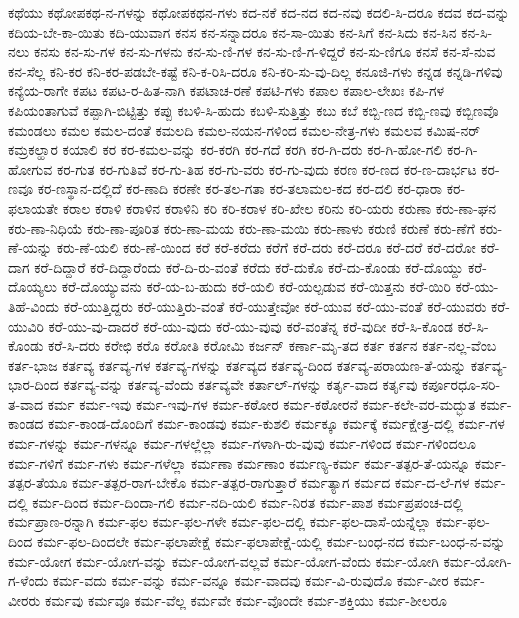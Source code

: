 {ಕಥೆಯು
ಕಥೋಪಕಥ-ನ-ಗಳನ್ನು
ಕಥೋಪಕಥನ-ಗಳು
ಕದ-ನಕೆ
ಕದ-ನದ
ಕದ-ನವು
ಕದಲಿ-ಸಿ-ದರೂ
ಕದವ
ಕದ-ವನ್ನು
ಕದಿಯ-ಬೇ-ಕಾ-ಯಿತು
ಕದಿ-ಯುವಾಗ
ಕನಸ
ಕನ-ಸನ್ನಾದರೂ
ಕನ-ಸಾ-ಯಿತು
ಕನ-ಸಿಗೆ
ಕನ-ಸಿದು
ಕನ-ಸಿನ
ಕನ-ಸಿ-ನಲು
ಕನಸು
ಕನ-ಸು-ಗಳ
ಕನ-ಸು-ಗಳನು
ಕನ-ಸು-ಣಿ-ಗಳ
ಕನ-ಸು-ಣಿ-ಗ-ಳಿದ್ದರೆ
ಕನ-ಸು-ಣಿಗೂ
ಕನಸೆ
ಕನ-ಸೆ-ನುವ
ಕನ-ಸೆಲ್ಲ
ಕನಿ-ಕರ
ಕನಿ-ಕರ-ಪಡಬೇ-ಕಷ್ಟೆ
ಕನಿ-ಕ-ರಿಸಿ-ದರೂ
ಕನಿ-ಕರಿ-ಸು-ವು-ದಿಲ್ಲ
ಕನೂಜಿ-ಗಳು
ಕನ್ನಡ
ಕನ್ನಡಿ-ಗಳಿವು
ಕನ್ಯೆಯ-ರಾಗೇ
ಕಪಟ
ಕಪಟ-ರ-ಹಿತ-ನಾಗಿ
ಕಪಟಾಚ-ರಣೆ
ಕಪಟಿ-ಗಳು
ಕಪಾಲ
ಕಪಾಲ-ಲೇಖಃ
ಕಪಿ-ಗಳ
ಕಪಿಯಂತಾಗುವೆ
ಕಪ್ಪಾಗಿ-ಬಿಟ್ಟಿತ್ತು
ಕಪ್ಪು
ಕಬಳಿ-ಸಿ-ಹುದು
ಕಬಳಿ-ಸುತ್ತಿತ್ತು
ಕಬು
ಕಬೆ
ಕಬ್ಬಿ-ಣದ
ಕಬ್ಬಿ-ಣವು
ಕಬ್ಬಿಣವೊ
ಕಮಂಡಲು
ಕಮಲ
ಕಮಲ-ದಂತೆ
ಕಮಲದಿ
ಕಮಲ-ನಯನ-ಗಳಿಂದ
ಕಮಲ-ನೇತ್ರ-ಗಳು
ಕಮಲವ
ಕಮಿಷ-ನರ್
ಕಮ್ರಕಲ್ಹಾರ
ಕಯಾಲಿ
ಕರ
ಕರ-ಕಮಲ-ವನ್ನು
ಕರ-ಕರಗಿ
ಕರ-ಗದೆ
ಕರಗಿ
ಕರ-ಗಿ-ದರು
ಕರ-ಗಿ-ಹೋ-ಗಲಿ
ಕರ-ಗಿ-ಹೋಗುವ
ಕರ-ಗುತ
ಕರ-ಗುತಿವೆ
ಕರ-ಗು-ತಿಹ
ಕರ-ಗು-ವರು
ಕರ-ಗು-ವುದು
ಕರಣ
ಕರ-ಣದ
ಕರ-ಣ-ದಾರ್ಭಟ
ಕರ-ಣವೂ
ಕರ-ಣಸ್ಥಾನ-ದಲ್ಲಿದೆ
ಕರ-ಣಾದಿ
ಕರಣೇ
ಕರ-ತಲ-ಗತಾ
ಕರ-ತಲಾಮಲ-ಕದ
ಕರ-ದಲಿ
ಕರ-ಧಾರಾ
ಕರ-ಫಲಾಯತೇ
ಕರಾಲ
ಕರಾಳಿ
ಕರಾಳಿನ
ಕರಾಳಿನಿ
ಕರಿ
ಕರಿ-ಕರಾಳ
ಕರಿ-ಖೇಲ
ಕರಿನು
ಕರಿ-ಯರು
ಕರುಣಾ
ಕರು-ಣಾ-ಘನ
ಕರು-ಣಾ-ನಿಧಿಯೆ
ಕರು-ಣಾ-ಪೂರಿತ
ಕರು-ಣಾ-ಮಯ
ಕರು-ಣಾ-ಮಯಿ
ಕರು-ಣಾಳು
ಕರುಣಿ
ಕರುಣೆ
ಕರು-ಣೆಗೆ
ಕರು-ಣೆ-ಯನ್ನು
ಕರು-ಣೆ-ಯಲಿ
ಕರು-ಣೆ-ಯಿಂದ
ಕರೆ
ಕರೆ-ಕರೆದು
ಕರೆಗೆ
ಕರೆ-ದರು
ಕರೆ-ದರೂ
ಕರೆ-ದರೆ
ಕರೆ-ದರೋ
ಕರೆ-ದಾಗ
ಕರೆ-ದಿದ್ದಾರೆ
ಕರೆ-ದಿದ್ದಾರೆಂದು
ಕರೆ-ದಿ-ರು-ವಂತೆ
ಕರೆದು
ಕರೆ-ದುಕೊ
ಕರೆ-ದು-ಕೊಂಡು
ಕರೆ-ದೊಯ್ದು
ಕರೆ-ದೊಯ್ಯಲು
ಕರೆ-ದೊಯ್ಯುವನು
ಕರೆ-ಯ-ಬ-ಹುದು
ಕರೆ-ಯಲಿ
ಕರೆ-ಯಲ್ಪಡುವ
ಕರೆ-ಯಿತ್ತನು
ಕರೆ-ಯಿರಿ
ಕರೆ-ಯು-ತಿಹೆ-ವಿಂದು
ಕರೆ-ಯುತ್ತಿದ್ದರು
ಕರೆ-ಯುತ್ತಿರು-ವಂತೆ
ಕರೆ-ಯುತ್ತೇವೋ
ಕರೆ-ಯುವ
ಕರೆ-ಯು-ವಂತೆ
ಕರೆ-ಯುವರು
ಕರೆ-ಯುವಿರಿ
ಕರೆ-ಯು-ವು-ದಾದರೆ
ಕರೆ-ಯು-ವುದು
ಕರೆ-ಯು-ವುವು
ಕರೆ-ವಂತೆನ್ನ
ಕರೆ-ವುದೀ
ಕರೆ-ಸಿ-ಕೊಂಡ
ಕರೆ-ಸಿ-ಕೊಂಡು
ಕರೆ-ಸಿ-ದರು
ಕರೇಛಿ
ಕರೊ
ಕರೋತಿ
ಕರೋಮಿ
ಕರ್ಜನ್
ಕರ್ಣಾ-ಮೃ-ತದ
ಕರ್ತ
ಕರ್ತನ
ಕರ್ತ-ನಲ್ಲ-ವೆಂಬ
ಕರ್ತ-ಭಾಜ
ಕರ್ತವ್ಯ
ಕರ್ತವ್ಯ-ಗಳ
ಕರ್ತವ್ಯ-ಗಳನ್ನು
ಕರ್ತವ್ಯದ
ಕರ್ತವ್ಯ-ದಿಂದ
ಕರ್ತವ್ಯ-ಪರಾಯಣ-ತೆ-ಯನ್ನು
ಕರ್ತವ್ಯ-ಭಾರ-ದಿಂದ
ಕರ್ತವ್ಯ-ವನ್ನು
ಕರ್ತವ್ಯ-ವೆಂದು
ಕರ್ತವ್ಯವೇ
ಕರ್ತಾಲ್-ಗಳನ್ನು
ಕರ್ತೃ-ವಾದ
ಕರ್ತೃವು
ಕರ್ಪೂರಧೂ-ಸರಿ-ತ-ವಾದ
ಕರ್ಮ
ಕರ್ಮ-ಇವು
ಕರ್ಮ-ಇವು-ಗಳ
ಕರ್ಮ-ಕಠೋರ
ಕರ್ಮ-ಕಠೋರನೆ
ಕರ್ಮ-ಕಲೇ-ವರ-ಮದ್ಭುತ
ಕರ್ಮ-ಕಾಂಡದ
ಕರ್ಮ-ಕಾಂಡ-ದೊಂದಿಗೆ
ಕರ್ಮ-ಕಾಂಡವು
ಕರ್ಮ-ಕುಶಲಿ
ಕರ್ಮಕ್ಕೂ
ಕರ್ಮಕ್ಕೆ
ಕರ್ಮಕ್ಷೇತ್ರ-ದಲ್ಲಿ
ಕರ್ಮ-ಗಳ
ಕರ್ಮ-ಗಳನ್ನು
ಕರ್ಮ-ಗಳನ್ನೂ
ಕರ್ಮ-ಗಳಲ್ಲೆಲ್ಲಾ
ಕರ್ಮ-ಗಳಾಗಿ-ರು-ವುವು
ಕರ್ಮ-ಗಳಿಂದ
ಕರ್ಮ-ಗಳಿಂದಲೂ
ಕರ್ಮ-ಗಳಿಗೆ
ಕರ್ಮ-ಗಳು
ಕರ್ಮ-ಗಳೆಲ್ಲಾ
ಕರ್ಮಣಾ
ಕರ್ಮಣಾಂ
ಕರ್ಮಣ್ಯ-ಕರ್ಮ
ಕರ್ಮ-ತತ್ಪರ-ತೆ-ಯನ್ನೂ
ಕರ್ಮ-ತತ್ಪರ-ತೆಯೂ
ಕರ್ಮ-ತತ್ಪರ-ರಾಗ-ಬೇಕೊ
ಕರ್ಮ-ತತ್ಪರ-ರಾಗುತ್ತಾರೆ
ಕರ್ಮತ್ಯಾಗ
ಕರ್ಮದ
ಕರ್ಮ-ದ-ಲೆ-ಗಳ
ಕರ್ಮ-ದಲ್ಲಿ
ಕರ್ಮ-ದಿಂದ
ಕರ್ಮ-ದಿಂದಾ-ಗಲಿ
ಕರ್ಮ-ನದಿ-ಯಲಿ
ಕರ್ಮ-ನಿರತ
ಕರ್ಮ-ಪಾಶ
ಕರ್ಮಪ್ರಪಂಚ-ದಲ್ಲಿ
ಕರ್ಮಪ್ರಾಣ-ರನ್ನಾಗಿ
ಕರ್ಮ-ಫಲ
ಕರ್ಮ-ಫಲ-ಗಳೇ
ಕರ್ಮ-ಫಲ-ದಲ್ಲಿ
ಕರ್ಮ-ಫಲ-ದಾಸೆ-ಯನ್ನೆಲ್ಲಾ
ಕರ್ಮ-ಫಲ-ದಿಂದ
ಕರ್ಮ-ಫಲ-ದಿಂದಲೇ
ಕರ್ಮ-ಫಲಾಪೇಕ್ಷೆ
ಕರ್ಮ-ಫಲಾಪೇಕ್ಷೆ-ಯಲ್ಲಿ
ಕರ್ಮ-ಬಂಧ-ನದ
ಕರ್ಮ-ಬಂಧ-ನ-ವನ್ನು
ಕರ್ಮ-ಯೋಗ
ಕರ್ಮ-ಯೋಗ-ವನ್ನು
ಕರ್ಮ-ಯೋಗ-ವಲ್ಲವೆ
ಕರ್ಮ-ಯೋಗ-ವೆಂದು
ಕರ್ಮ-ಯೋಗಿ
ಕರ್ಮ-ಯೋಗಿ-ಗ-ಳೆಂದು
ಕರ್ಮ-ವದು
ಕರ್ಮ-ವನ್ನು
ಕರ್ಮ-ವನ್ನೂ
ಕರ್ಮ-ವಾದವು
ಕರ್ಮ-ವಿ-ರುವುದೊ
ಕರ್ಮ-ವೀರ
ಕರ್ಮ-ವೀರರು
ಕರ್ಮವು
ಕರ್ಮವೂ
ಕರ್ಮ-ವೆಲ್ಲ
ಕರ್ಮವೇ
ಕರ್ಮ-ವೊಂದೇ
ಕರ್ಮ-ಶಕ್ತಿಯು
ಕರ್ಮ-ಶೀಲರೂ
}
